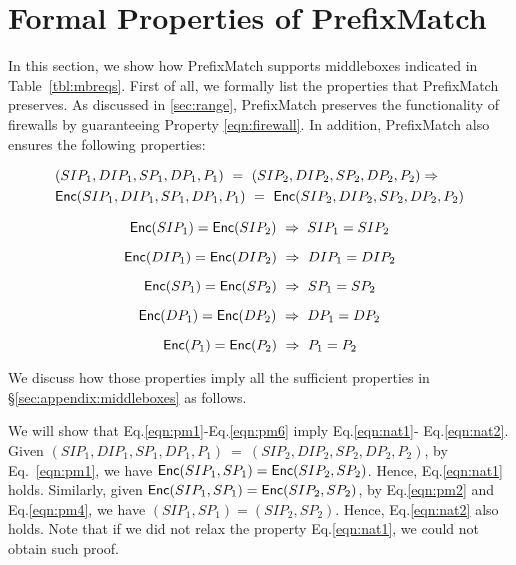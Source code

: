 \section{Formal Properties of PrefixMatch}

In this section, we show how PrefixMatch supports middleboxes indicated in Table~\ref{tbl:mbreqs}.
First of all, we formally list the properties that PrefixMatch preserves. As discussed in \ref{sec:range},
PrefixMatch preserves the functionality of firewalls by guaranteeing Property \ref{eqn:firewall}. In addition,
PrefixMatch also ensures the following properties:

\begin{equation}
\label{eqn:pm1}
\begin{split}
& (SIP_1, DIP_1, SP_1, DP_1, P_1)\ =\ (SIP_2, DIP_2, SP_2, DP_2, P_2) \Rightarrow \\
& \mathsf{Enc}(SIP_1, DIP_1, SP_1, DP_1, P_1)\ =\ \mathsf{Enc}(SIP_2, DIP_2, SP_2, DP_2, P_2)
\end{split}
\end{equation}

\begin{equation}
\label{eqn:pm2}
\mathsf{Enc}(SIP_1) = \mathsf{Enc}(SIP_2)\ \Rightarrow\ SIP_1 = SIP_2
\end{equation}

\begin{equation}
\label{eqn:pm3}
\mathsf{Enc}(DIP_1) = \mathsf{Enc}(DIP_2)\ \Rightarrow\ DIP_1 = DIP_2
\end{equation}

\begin{equation}
\label{eqn:pm4}
\mathsf{Enc}(SP_1) = \mathsf{Enc}(SP_2)\ \Rightarrow\ SP_1 = SP_2
\end{equation}

\begin{equation}
\label{eqn:pm5}
\mathsf{Enc}(DP_1) = \mathsf{Enc}(DP_2)\ \Rightarrow\ DP_1 = DP_2
\end{equation}

\begin{equation}
\label{eqn:pm6}
\mathsf{Enc}(P_1) = \mathsf{Enc}(P_2)\ \Rightarrow\ P_1 = P_2
\end{equation}

We discuss how those properties imply all the sufficient properties in \S\ref{sec:appendix:middleboxes} as follows.

We will show that Eq.\eqref{eqn:pm1}-Eq.\eqref{eqn:pm6} imply Eq.\eqref{eqn:nat1}-
Eq.\eqref{eqn:nat2}. Given $(SIP_1, DIP_1, SP_1, DP_1, P_1)\ =\ (SIP_2, DIP_2, SP_2, DP_2, P_2)$, 
by Eq.~\eqref{eqn:pm1},
we have $\mathsf{Enc}(SIP_1, SP_1) = \mathsf{Enc}(SIP_2, SP_2)$. Hence, Eq.\eqref{eqn:nat1} holds. Similarly, 
given $\mathsf{Enc}(SIP_1, SP_1) = \mathsf{Enc}(SIP_2, SP_2)$, by Eq.\eqref{eqn:pm2} and Eq.\eqref{eqn:pm4}, 
we have $(SIP_1, SP_1) = (SIP_2, SP_2)$. Hence, Eq.\eqref{eqn:nat2} also holds. Note that if
we did not relax the property Eq.\eqref{eqn:nat1}, we could not obtain such proof.

